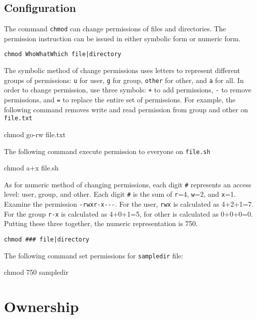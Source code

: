 \subsection{Configuration}

The command \verb|chmod| can change permissions of files and directories. The permission instruction can be issued in either symbolic form or numeric form.\\

\begin{verbatim}
chmod WhoWhatWhich file|directory
\end{verbatim}

The symbolic method of change permissions uses letters to represent different groups of permissions: \verb|u| for user, \verb|g| for group, \verb|other| for other, and \verb|a| for all. In order to change permission, use three symbols: \verb|+| to add permissions, \verb|-| to remove permissions, and \verb|=| to replace the entire set of permissions. For example, the following command removes write and read permission from group and other on \verb|file.txt|

\begin{commandshell}
chmod go-rw file.txt
\end{commandshell}

The  following command execute permission to everyone on \verb|file.sh|

\begin{commandshell}
chmod a+x file.sh
\end{commandshell}

As for numeric method of changing permissions, each digit \verb|#| represents an access level: user, group, and other. Each digit \verb|#| is the sum of \verb|r|=4, \verb|w|=2, and \verb|x|=1. Examine the permission \verb|-rwxr-x---|. For the user, \verb|rwx| is calculated as 4+2+1=7. For the group \verb|r-x| is calculated as 4+0+1=5, for other is calculated as 0+0+0=0. Putting these three together, the numeric representation is 750.

\begin{verbatim}
chmod ### file|directory
\end{verbatim}

The following command set permissions for \verb|sampledir| file:

\begin{commandshell}
chmod 750 sampledir
\end{commandshell}

\section{Ownership}

